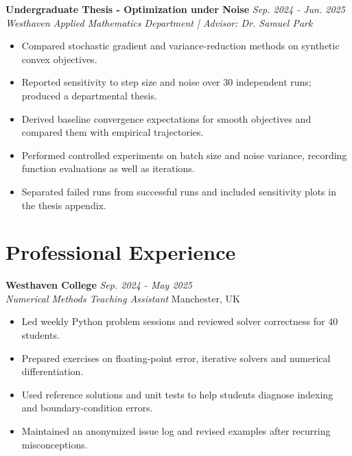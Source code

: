 \documentclass[11pt,a4paper]{article}
\begin{document}
\textbf{Undergraduate Thesis - Optimization under Noise} \hfill \textit{Sep. 2024 - Jun. 2025}\\
\textit{Westhaven Applied Mathematics Department | Advisor: Dr. Samuel Park}
\begin{itemize}[leftmargin=*,noitemsep,topsep=2pt]
\item Compared stochastic gradient and variance-reduction methods on synthetic convex objectives.
\item Reported sensitivity to step size and noise over 30 independent runs; produced a departmental thesis.
\item Derived baseline convergence expectations for smooth objectives and compared them with empirical trajectories.
\item Performed controlled experiments on batch size and noise variance, recording function evaluations as well as iterations.
\item Separated failed runs from successful runs and included sensitivity plots in the thesis appendix.
\end{itemize}

\section{Professional Experience}
\textbf{Westhaven College} \hfill \textit{Sep. 2024 - May 2025}\\
\textit{Numerical Methods Teaching Assistant} \hfill Manchester, UK
\begin{itemize}[leftmargin=*,noitemsep,topsep=2pt]
\item Led weekly Python problem sessions and reviewed solver correctness for 40 students.
\item Prepared exercises on floating-point error, iterative solvers and numerical differentiation.
\item Used reference solutions and unit tests to help students diagnose indexing and boundary-condition errors.
\item Maintained an anonymized issue log and revised examples after recurring misconceptions.
\end{itemize}
\vspace{4pt}
\end{document}
